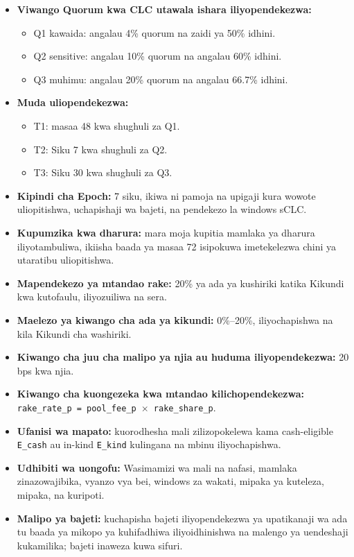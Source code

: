 \documentclass[11pt]{article}
\begin{document}
\begin{itemize}[leftmargin=*]
\item \textbf{Viwango Quorum kwa CLC utawala ishara iliyopendekezwa:}
\begin{itemize}[leftmargin=*]
\item Q1 kawaida: angalau 4\% quorum na zaidi ya 50\% idhini.
\item Q2 sensitive: angalau 10\% quorum na angalau 60\% idhini.
\item Q3 muhimu: angalau 20\% quorum na angalau 66.7\% idhini.
\end{itemize}
\item \textbf{Muda uliopendekezwa:}
\begin{itemize}[leftmargin=*]
\item T1: masaa 48 kwa shughuli za Q1.
\item T2: Siku 7 kwa shughuli za Q2.
\item T3: Siku 30 kwa shughuli za Q3.
\end{itemize}
\item \textbf{Kipindi cha Epoch:} 7 siku, ikiwa ni pamoja na upigaji kura wowote uliopitishwa, uchapishaji wa bajeti, na pendekezo la windows sCLC.
\item \textbf{Kupumzika kwa dharura:} mara moja kupitia mamlaka ya dharura iliyotambuliwa, ikiisha baada ya masaa 72 isipokuwa imetekelezwa chini ya utaratibu uliopitishwa.
\item \textbf{Mapendekezo ya mtandao rake:} 20\% ya ada ya kushiriki katika Kikundi kwa kutofaulu, iliyozuiliwa na sera.
\item \textbf{Maelezo ya kiwango cha ada ya kikundi:} 0\%--20\%, iliyochapishwa na kila Kikundi cha washiriki.
\item \textbf{Kiwango cha juu cha malipo ya njia au huduma iliyopendekezwa:} 20 bps kwa njia.
\item \textbf{Kiwango cha kuongezeka kwa mtandao kilichopendekezwa:} \texttt{rake\_rate\_p = pool\_fee\_p $\times$ rake\_share\_p}.
\item \textbf{Ufanisi wa mapato:} kuorodhesha mali zilizopokelewa kama cash-eligible \texttt{E\_cash} au in-kind \texttt{E\_kind} kulingana na mbinu iliyochapishwa.
\item \textbf{Udhibiti wa uongofu:} Wasimamizi wa mali na nafasi, mamlaka zinazowajibika, vyanzo vya bei, windows za wakati, mipaka ya kuteleza, mipaka, na kuripoti.
\item \textbf{Malipo ya bajeti:} kuchapisha bajeti iliyopendekezwa ya upatikanaji wa ada tu baada ya mikopo ya kuhifadhiwa iliyoidhinishwa na malengo ya uendeshaji kukamilika; bajeti inaweza kuwa sifuri.

\end{itemize}
\end{document}
